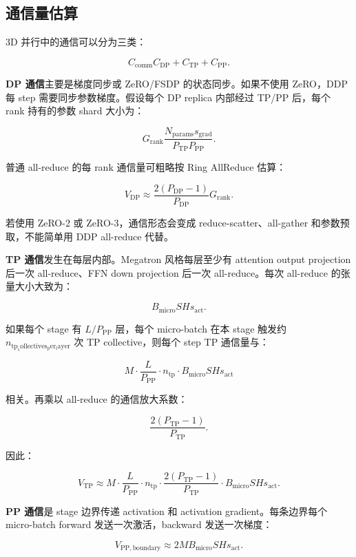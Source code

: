 \subsection{通信量估算}
\label{subsec:communication-estimation}

3D 并行中的通信可以分为三类：

\[
C_{\mathrm{comm}}
C_{\mathrm{DP}}
+
C_{\mathrm{TP}}
+
C_{\mathrm{PP}}.
\]

\textbf{DP 通信}主要是梯度同步或 ZeRO/FSDP 的状态同步。如果不使用 ZeRO，DDP 每 step 需要同步参数梯度。假设每个 DP replica 内部经过 TP/PP 后，每个 rank 持有的参数 shard 大小为：

\[
G_{\mathrm{rank}}
\frac{N_{\mathrm{params}}s_{\mathrm{grad}}}
{P_{\mathrm{TP}}P_{\mathrm{PP}}}.
\]

普通 all-reduce 的每 rank 通信量可粗略按 Ring AllReduce 估算：

\[
V_{\mathrm{DP}}
\approx
\frac{2(P_{\mathrm{DP}}-1)}{P_{\mathrm{DP}}}
G_{\mathrm{rank}}.
\]

若使用 ZeRO-2 或 ZeRO-3，通信形态会变成 reduce-scatter、all-gather 和参数预取，不能简单用 DDP all-reduce 代替。

\textbf{TP 通信}发生在每层内部。Megatron 风格每层至少有 attention output projection 后一次 all-reduce、FFN down projection 后一次 all-reduce。每次 all-reduce 的张量大小大致为：

\[
B_{\mathrm{micro}}S Hs_{\mathrm{act}}.
\]

如果每个 stage 有 $L/P_{\mathrm{PP}}$ 层，每个 micro-batch 在本 stage 触发约 $n_{\mathrm{tp_collectives_per_layer}}$ 次 TP collective，则每个 step TP 通信量与：

\[
M
\cdot
\frac{L}{P_{\mathrm{PP}}}
\cdot
n_{\mathrm{tp}}
\cdot
B_{\mathrm{micro}}S Hs_{\mathrm{act}}
\]

相关。再乘以 all-reduce 的通信放大系数：

\[
\frac{2(P_{\mathrm{TP}}-1)}{P_{\mathrm{TP}}}.
\]

因此：

\[
V_{\mathrm{TP}}
\approx
M
\cdot
\frac{L}{P_{\mathrm{PP}}}
\cdot
n_{\mathrm{tp}}
\cdot
\frac{2(P_{\mathrm{TP}}-1)}{P_{\mathrm{TP}}}
\cdot
B_{\mathrm{micro}}S Hs_{\mathrm{act}}.
\]

\textbf{PP 通信}是 stage 边界传递 activation 和 activation gradient。每条边界每个 micro-batch forward 发送一次激活，backward 发送一次梯度：

\[
V_{\mathrm{PP,boundary}}
\approx
2M B_{\mathrm{micro}}S Hs_{\mathrm{act}}.
\]

